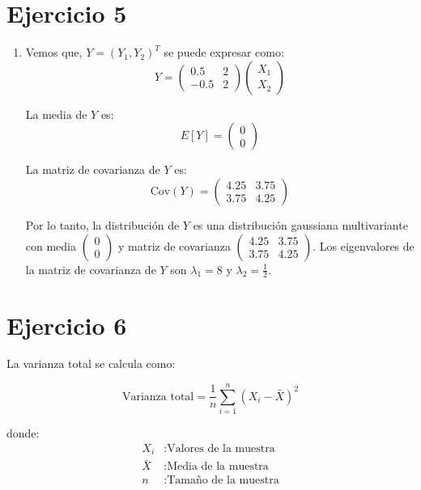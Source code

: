 \documentclass{article}
\begin{document}
\section{Ejercicio 5}
\begin{enumerate}
	\item Vemos que, \( Y = (Y_1, Y_2)^T \) se puede expresar como:
\[
Y = \begin{pmatrix} 0.5 & 2 \\ -0.5 & 2 \end{pmatrix} \begin{pmatrix} X_1 \\ X_2 \end{pmatrix}
\]

La media de \( Y \) es:
\[
E[Y] = \begin{pmatrix} 0 \\ 0 \end{pmatrix}
\]

La matriz de covarianza de \( Y \) es:
\[
\text{Cov}(Y) = \begin{pmatrix} 4.25 & 3.75 \\ 3.75 & 4.25 \end{pmatrix}
\]

Por lo tanto, la distribución de \( Y \) es una distribución gaussiana multivariante con media \( \begin{pmatrix} 0 \\ 0 \end{pmatrix} \) y matriz de covarianza \( \begin{pmatrix} 4.25 & 3.75 \\ 3.75 & 4.25 \end{pmatrix} \).
Los eigenvalores de la matriz de covarianza de $Y$ son $\lambda_{1} = 8$ y $\lambda_{2} = \frac{1}{2}$.


\end{enumerate}


\section{Ejercicio 6}

La varianza total se calcula como:

\[
\text{Varianza total} = \frac{1}{n} \sum_{i=1}^{n} (X_i - \bar{X})^2
\]

donde:
\begin{align*}
    X_i & : \text{Valores de la muestra} \\
    \bar{X} & : \text{Media de la muestra} \\
    n & : \text{Tamaño de la muestra}
\end{align*}
\end{document}
